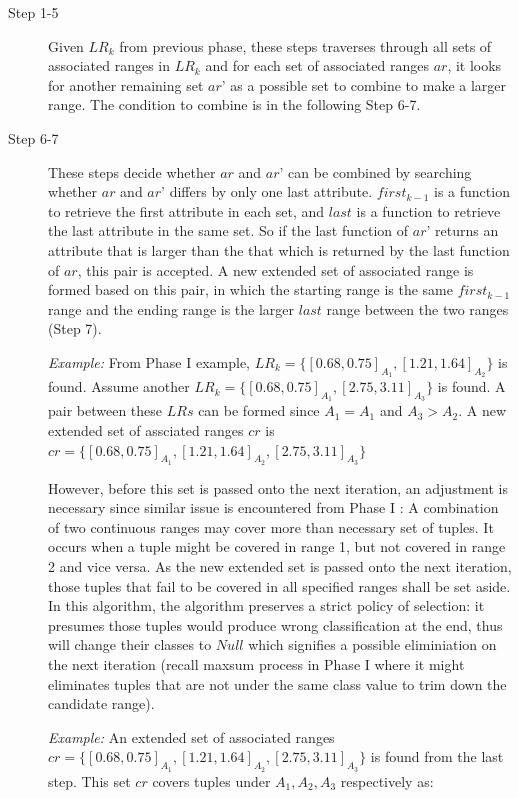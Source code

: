 \begin{description}
\item[Step 1-5] Given $LR_k$ from previous phase, these steps traverses through all sets of associated ranges in $LR_k$ and for each set of associated ranges $ar$, it looks for another remaining set $ar’$ as a possible set to combine to make a larger range. The condition to combine is in the following Step 6-7. 

\item[Step 6-7] These steps decide whether $ar$ and $ar’$ can be combined by searching whether $ar$ and $ar’$ differs by only one last attribute. $first_{k-1}$ is a function to retrieve the first attribute in each set, and $last$ is a function to retrieve the last attribute in the same set. So if the last function of $ar’$ returns an attribute that is larger than the that which is returned by the last function of $ar$, this pair is accepted. A new extended set of associated range is formed based on this pair, in which the starting range is the same $first_{k-1}$ range and the ending range is the larger $last$ range between the two ranges (Step 7). 

\textit{Example: } From Phase I example, $LR_k = \{[0.68, 0.75]_{A_1}, [1.21,1.64]_{A_2}\}$ is found. Assume another $LR_k = \{[0.68, 0.75]_{A_1}, [2.75,3.11]_{A_3}\}$ is found. A pair between these $LRs$ can be formed since $A_1 = A_1$ and $A_3 > A_2$. A new extended set of assciated ranges $cr$ is
$cr = \{[0.68, 0.75]_{A_1}, [1.21,1.64]_{A_2}, [2.75,3.11]_{A_3}\}$

However, before this set is passed onto the next iteration, an adjustment is necessary since similar issue is encountered from Phase I : A combination of two continuous ranges may cover more than necessary set of tuples. It occurs when a tuple might be covered in range 1, but not covered in range 2 and vice versa. As the new extended set is passed onto the next iteration, those tuples that fail to be covered in all specified ranges shall be set aside. In this algorithm, the algorithm preserves a strict policy of selection: it presumes those tuples would produce wrong classification at the end, thus will change their classes to $Null$ which signifies a possible eliminiation on the next iteration (recall maxsum process in Phase I where it might eliminates tuples that are not under the same class value to trim down the candidate range).

\textit{Example: } An extended set of associated ranges $cr = \{[0.68, 0.75]_{A_1}, [1.21,1.64]_{A_2}, [2.75,3.11]_{A_3}\}$ is found from the last step. This set $cr$ covers tuples under $A_1, A_2, A_3$ respectively as:


\end{description}
